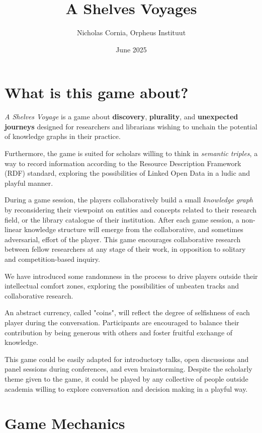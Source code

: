 \documentclass{article}
\title{A Shelves Voyages}
\author{Nicholas Cornia, Orpheus Instituut}
\date{June 2025}
\begin{document}
\maketitle

\begin{multicols}{2}

\section*{What is this game about?}\label{whatisthisgameabout}

\textit{A Shelves Voyage} is a game about \textbf{discovery}, \textbf{plurality}, and \textbf{unexpected journeys} designed for researchers and librarians wishing to unchain the potential of knowledge graphs in their practice.

Furthermore, the game is suited for scholars willing to think in \textit{semantic triples}, a way to record information according to the Resource Description Framework (RDF) standard, exploring the possibilities of Linked Open Data in a ludic and playful manner.

During a game session, the players collaboratively build a small \textit{knowledge graph} by reconsidering their viewpoint on entities and concepts related to their research field, or the library catalogue of their institution. After each game session, a non-linear knowledge structure will emerge from the collaborative, and sometimes adversarial, effort of the player. This game encourages collaborative research between fellow researchers at any stage of their work, in opposition to solitary and competition-based inquiry.

We have introduced some randomness in the process to drive players outside their intellectual comfort zones, exploring the possibilities of unbeaten tracks and collaborative research.

An abstract currency, called "coins", will reflect the degree of selfishness of each player during the conversation. Participants are encouraged to balance their contribution by being generous with others and foster fruitful exchange of knowledge.

This game could be easily adapted for introductory talks, open discussions and panel sessions during conferences, and even brainstorming. Despite the scholarly theme given to the game, it could be played by any collective of people outside academia willing to explore conversation and decision making in a playful way.

\section{Game Mechanics}\label{gamemechanics}


\end{multicols}
\end{document}

